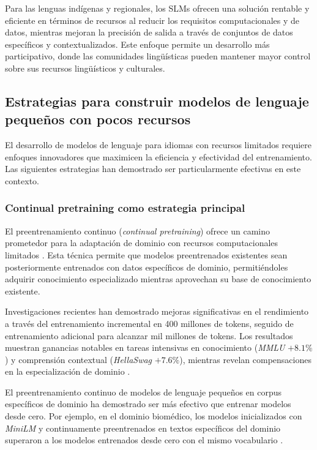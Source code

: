 \documentclass[10pt,twoside]{rcmart} %
\begin{document}
Para las lenguas indígenas y regionales, los SLMs ofrecen una solución rentable y eficiente en términos de recursos al reducir los requisitos computacionales y de datos, mientras mejoran la precisión de salida a través de conjuntos de datos específicos y contextualizados. Este enfoque permite un desarrollo más participativo, donde las comunidades lingüísticas pueden mantener mayor control sobre sus recursos lingüísticos y culturales.

\subsection{Estrategias para construir modelos de lenguaje pequeños con pocos recursos}

El desarrollo de modelos de lenguaje para idiomas con recursos limitados requiere enfoques innovadores que maximicen la eficiencia y efectividad del entrenamiento. Las siguientes estrategias han demostrado ser particularmente efectivas en este contexto.

\subsubsection{Continual pretraining como estrategia principal}

El preentrenamiento continuo (\textit{continual pretraining}) ofrece un camino prometedor para la adaptación de dominio con recursos computacionales limitados \cite{wu2024continual}. Esta técnica permite que modelos preentrenados existentes sean posteriormente entrenados con datos específicos de dominio, permitiéndoles adquirir conocimiento especializado mientras aprovechan su base de conocimiento existente.

Investigaciones recientes han demostrado mejoras significativas en el rendimiento a través del entrenamiento incremental en 400 millones de tokens, seguido de entrenamiento adicional para alcanzar mil millones de tokens. Los resultados muestran ganancias notables en tareas intensivas en conocimiento (\textit{MMLU} $+8.1\%$) y comprensión contextual (\textit{HellaSwag} $+7.6\%$), mientras revelan compensaciones en la especialización de dominio \cite{ishibashi2025mining}.

El preentrenamiento continuo de modelos de lenguaje pequeños en corpus específicos de dominio ha demostrado ser más efectivo que entrenar modelos desde cero. Por ejemplo, en el dominio biomédico, los modelos inicializados con \textit{MiniLM} y continuamente preentrenados en textos específicos del dominio superaron a los modelos entrenados desde cero con el mismo vocabulario \cite{yan2023af}.
\end{document}
